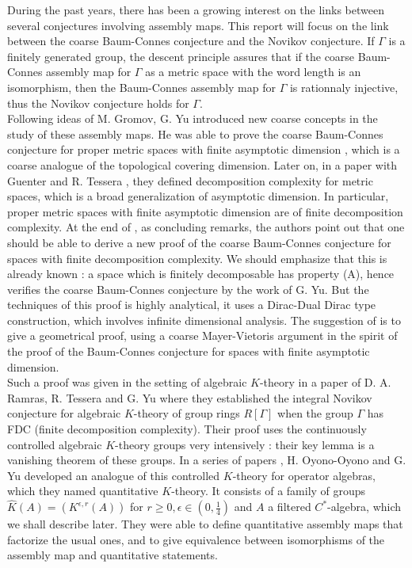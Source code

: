 
During the past years, there has been a growing interest on the links between several conjectures involving assembly maps. This report will focus on the link between the coarse Baum-Connes conjecture and the Novikov conjecture. If $\Gamma$ is a finitely generated group, the descent principle assures that if the coarse Baum-Connes assembly map for $\Gamma$ as a metric space with the word length is an isomorphism, then the Baum-Connes assembly map for $\Gamma$ is rationnaly injective, thus the Novikov conjecture holds for $\Gamma$.\\

Following ideas of M. Gromov, G. Yu introduced new coarse concepts in the study of these assembly maps. He was able to prove the coarse Baum-Connes conjecture for proper metric spaces with finite asymptotic dimension \cite{Yu1}, which is a coarse analogue of the topological covering dimension. Later on, in a paper with Guenter and R. Tessera \cite{GTY}, they defined decomposition complexity for metric spaces, which is a broad generalization of asymptotic dimension. In particular, proper metric spaces with finite asymptotic dimension are of finite decomposition complexity. At the end of \cite{GTY}, as concluding remarks, the authors point out that one should be able to derive a new proof of the coarse Baum-Connes conjecture for spaces with finite decomposition complexity. We should emphasize that this is already known : a space which is finitely decomposable has property (A), hence verifies the coarse Baum-Connes conjecture by the work of G. Yu. \cite{Yu2} But the techniques of this proof is highly analytical, it uses a Dirac-Dual Dirac type construction, which involves infinite dimensional analysis. The suggestion of \cite{GTY} is to give a geometrical proof, using a coarse Mayer-Vietoris argument in the spirit of the proof of the Baum-Connes conjecture for spaces with finite asymptotic dimension.\\

Such a proof was given in the setting of algebraic $K$-theory in a paper of D. A. Ramras, R. Tessera and G. Yu where they established the integral Novikov conjecture for algebraic $K$-theory of group rings $R[\Gamma]$ when the group $\Gamma$ has FDC (finite decomposition complexity). Their proof uses the continuously controlled algebraic $K$-theory groups very intensively : their key lemma is a vanishing theorem of these groups. In a series of papers \cite{OY2}\cite{OY3}, H. Oyono-Oyono and G. Yu developed an analogue of this controlled $K$-theory for operator algebras, which they named quantitative $K$-theory. It consists of a family of groups $\hat K (A) = (K^{\epsilon,r}(A))$ for $r\geq 0,\epsilon \in (0,\frac{1}{4})$ and $A$ a filtered $C^*$-algebra, which we shall describe later. They were able to define quantitative assembly maps that factorize the usual ones, and to give equivalence between isomorphisms of the assembly map and quantitative statements.\\

